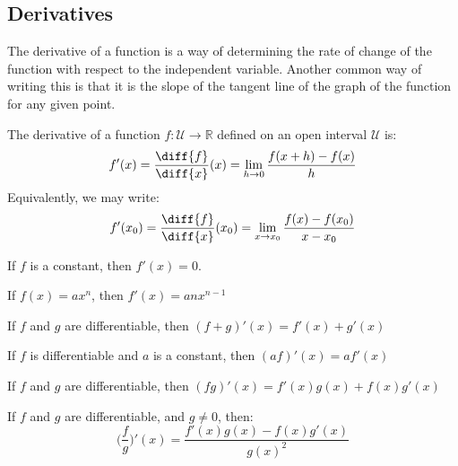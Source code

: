 \documentclass[crop=false,class=article,oneside]{standalone}
\begin{document}
    \subsection{Derivatives}
        The derivative of a function is a way of determining
        the rate of change of the function with respect to
        the independent variable. Another common way of
        writing this is that it is the slope of the tangent
        line of the graph of the function for any given
        point.
        \begin{definition}
            The derivative of a function
            $f:\mathcal{U}\rightarrow\mathbb{R}$
            defined on an open interval $\mathcal{U}$ is:
            \begin{equation*}
                f'(x)
                =\frac{\diff{f}}{\diff{x}}(x)
                =\lim_{h\rightarrow{0}}\frac{f(x+h)-f(x)}{h}
            \end{equation*}
            Equivalently, we may write:
            \begin{equation*}
                f'(x_{0})
                =\frac{\diff{f}}{\diff{x}}(x_{0})
                =\lim_{x\rightarrow{x_{0}}}
                \frac{f(x)-f(x_{0})}{x-x_{0}}
            \end{equation*}
        \end{definition}
        \begin{theorem}
            If $f$ is a constant, then $f'(x)=0$.
        \end{theorem}
        \begin{theorem}
            If $f(x)=ax^{n}$, then $f'(x)=anx^{n-1}$
        \end{theorem}
        \begin{theorem}
            If $f$ and $g$ are differentiable, then
            $(f+g)'(x)=f'(x)+g'(x)$
        \end{theorem}
        \begin{theorem}
            If $f$ is differentiable and $a$ is a constant,
            then $(af)'(x)=af'(x)$
        \end{theorem}
        \begin{theorem}
            If $f$ and $g$ are differentiable, then
            $(fg)'(x)=f'(x)g(x)+f(x)g'(x)$
        \end{theorem}
        \begin{theorem}
            If $f$ and $g$ are differentiable, and $g\ne{0}$,
            then:
            \begin{equation*}
                \Big(\frac{f}{g}\Big)'(x)
                =\frac{f'(x)g(x)-f(x)g'(x)}{g(x)^{2}}
            \end{equation*}
        \end{theorem}
\end{document}
